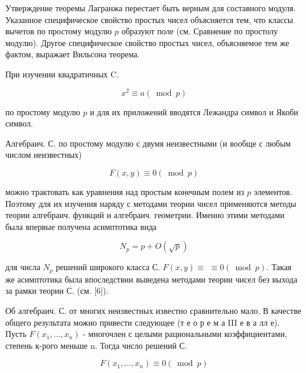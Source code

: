 \documentclass[10pt]{article}
\begin{document}
Утверждение теоремы Лагранжа перестает быть верным для составного модуля. Указанное специфическое свойство простых чисел объясняется тем, что классы вычетов по простому модулю $p$ образуют поле (см. Сравнение по простолу модулю). Другое специфическое свойство простых чисел, объясняемое тем же фактом, выражает Вильсона теорема.



При изучении квадратичных $\mathrm{C}$.



\[

x^{2} \equiv a(\bmod p)

\]



по простому модулю $p$ и для их приложений вводятся Лежандра символ и Якоби символ.



Алгебраич. С. по простому модулю с двумя неизвестными (и вообще с любым числом неизвестных)



\[

F(x, y) \equiv 0(\bmod p)

\]



можно трактовать как уравнения над простым конечным полем из $p$ элементов. Поэтому для их изучения наряду с методами теории чисел применяются методы теории алгебраич. функций и алгебраич. геометрии. Именно этими методами была впервые получена асимптотика вида



\[

N_{p}=p+O(\sqrt{p})

\]



для числа $N_{p}$ решений широкого класса С. $F(x, y) \equiv$ $\equiv 0(\bmod p)$. Такая же асимптотика была впоследствии выведена методами теории чисел без выхода за рамки теории С. (см. [6]).



Об алгебраич. С. от многих неизвестных известно сравнительно мало. В качестве общего результата можно привести следующее (т е о р е м а III е в а лл е). Пусть $F\left(x_{1}, \ldots, x_{n}\right)$ - многочлен с целыми рациональными коэффициентами, степень к-рого меньше n. Тогда число решений С.



\[

F\left(x_{1}, \ldots, x_{n}\right) \equiv 0(\bmod p)

\]
\end{document}

